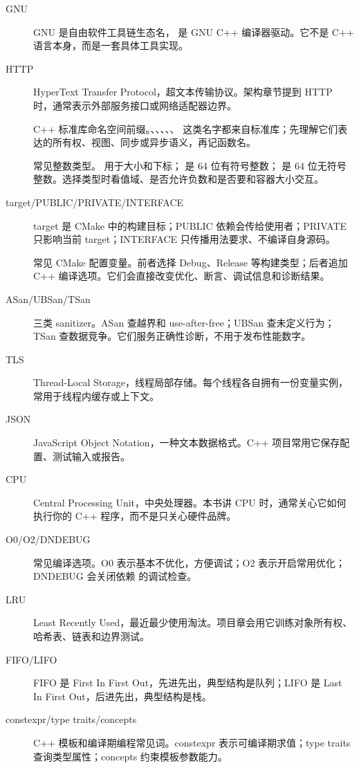 \begin{description}
  \item[GNU] GNU 是自由软件工具链生态名， 是 GNU C++ 编译器驱动。它不是 C++ 语言本身，而是一套具体工具实现。
  \item[HTTP] HyperText Transfer Protocol，超文本传输协议。架构章节提到 HTTP 时，通常表示外部服务接口或网络适配器边界。
  \item[] C++ 标准库命名空间前缀。、、、、、 这类名字都来自标准库；先理解它们表达的所有权、视图、同步或异步语义，再记函数名。
  \item[] 常见整数类型。 用于大小和下标； 是 64 位有符号整数； 是 64 位无符号整数。选择类型时看值域、是否允许负数和是否要和容器大小交互。
  \item[target/PUBLIC/PRIVATE/INTERFACE] target 是 CMake 中的构建目标；PUBLIC 依赖会传给使用者；PRIVATE 只影响当前 target；INTERFACE 只传播用法要求、不编译自身源码。
  \item[] 常见 CMake 配置变量。前者选择 Debug、Release 等构建类型；后者追加 C++ 编译选项。它们会直接改变优化、断言、调试信息和诊断结果。
  \item[ASan/UBSan/TSan] 三类 sanitizer。ASan 查越界和 use-after-free；UBSan 查未定义行为；TSan 查数据竞争。它们服务正确性诊断，不用于发布性能数字。
  \item[TLS] Thread-Local Storage，线程局部存储。每个线程各自拥有一份变量实例，常用于线程内缓存或上下文。
  \item[JSON] JavaScript Object Notation，一种文本数据格式。C++ 项目常用它保存配置、测试输入或报告。
  \item[CPU] Central Processing Unit，中央处理器。本书讲 CPU 时，通常关心它如何执行你的 C++ 程序，而不是只关心硬件品牌。
  \item[O0/O2/DNDEBUG] 常见编译选项。O0 表示基本不优化，方便调试；O2 表示开启常用优化；DNDEBUG 会关闭依赖  的调试检查。
  \item[LRU] Least Recently Used，最近最少使用淘汰。项目章会用它训练对象所有权、哈希表、链表和边界测试。
  \item[FIFO/LIFO] FIFO 是 First In First Out，先进先出，典型结构是队列；LIFO 是 Last In First Out，后进先出，典型结构是栈。
  \item[constexpr/type traits/concepts] C++ 模板和编译期编程常见词。constexpr 表示可编译期求值；type traits 查询类型属性；concepts 约束模板参数能力。

\end{description}

